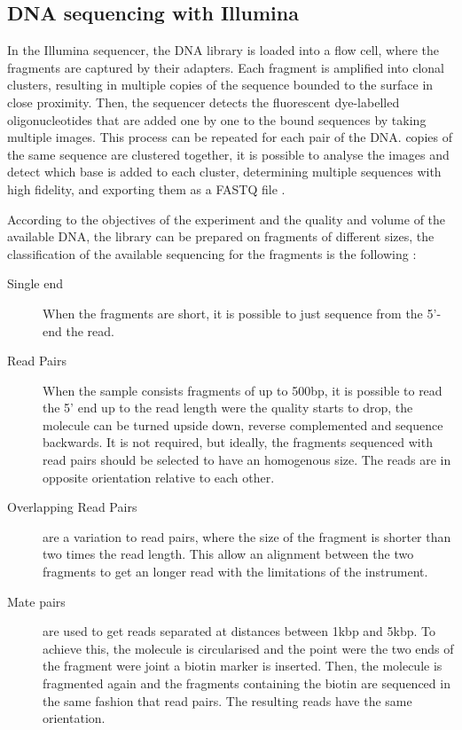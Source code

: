 \subsection{DNA sequencing with Illumina}

In the Illumina sequencer, the DNA library is loaded into a flow cell, where the fragments are captured by their adapters. 
Each fragment is amplified into clonal clusters, resulting in multiple copies of the sequence bounded to the surface in close proximity. 
Then, the sequencer detects the fluorescent dye-labelled oligonucleotides that are added one by one to the bound sequences by taking multiple images. 
This process can be repeated for each pair of the DNA. 
copies of the same sequence are clustered together, it is possible to analyse the images and detect which base is added to each cluster, determining multiple sequences with high fidelity, and exporting them as a FASTQ file \cite{RNAseqlopedia, truseq}.


According to the objectives of the experiment and the quality and volume of the available DNA, the library can be prepared on fragments of different sizes, the classification of the available sequencing for the fragments is the following \cite{Myllykangas2012,Metzker2010,Shendure2008,Hutchison2007}:

\begin{description}
\item[Single end] When the fragments are short, it is possible to just sequence from the 5'-end the read.
\item[Read Pairs] When the sample consists fragments of up to 500bp, it is possible to read the 5' end up to the read length were the quality starts to drop, the molecule can be turned upside down, reverse complemented and sequence backwards. It is not required, but ideally, the fragments sequenced with read pairs should be selected to have an homogenous size. The reads are in opposite orientation relative to each other. 
\item[Overlapping Read Pairs] are a variation to read pairs, where the size of the fragment is shorter than two times the read length. This allow an alignment between the two fragments to get an longer read with the limitations of the instrument.
\item[Mate pairs]  are used to get reads separated at distances between 1kbp and 5kbp. To achieve this, the molecule is circularised and the point were the two ends of the fragment were joint a biotin marker is inserted. Then, the molecule is fragmented again and the fragments containing the biotin are sequenced in the same fashion that read pairs. The resulting reads have the same orientation.
\end{description}


